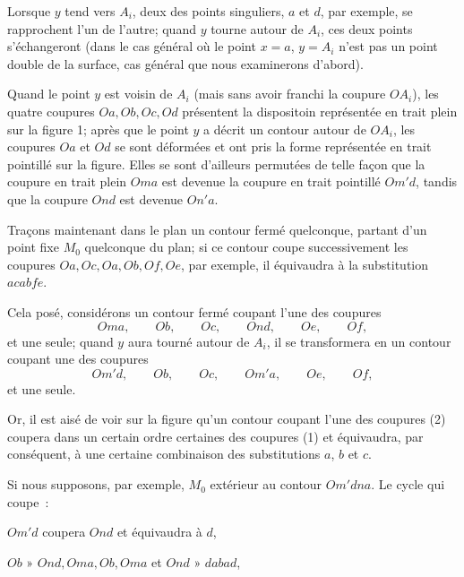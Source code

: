 \documentclass{article}
\begin{document}
Lorsque $y$ tend vers $A_{i}$, deux des points singuliers, $a$ et $d$, par exemple, se rapprochent l'un de l'autre; quand $y$ tourne autour de $A_{i}$, ces deux points s'échangeront (dans le cas général où le point $x = a$, $y = A_{i}$ n'est pas un point double de la surface, cas général que nous examinerons d'abord).

Quand le point $y$ est voisin de $A_{i}$ (mais sans avoir franchi la
coupure $OA_{i}$), les quatre coupures $Oa, Ob, Oc, Od$ présentent la dispositoin représentée en trait plein sur la figure 1; après que le point $y$ a décrit un contour autour de $OA_{i}$, les coupures $Oa$ et $Od$ se sont déformées et ont pris la forme représentée en trait
pointillé sur la figure. Elles se sont d'ailleurs permutées de telle façon que la coupure en trait plein $Oma$ est devenue la coupure en trait pointillé $Om'd$, tandis que la coupure $Ond$ est devenue $On'a$.

Traçons maintenant dans le plan un contour fermé quelconque, partant d'un point fixe $M_{0}$ quelconque du plan; si ce contour coupe successivement les coupures $Oa, Oc, Oa, Ob, Of, Oe$, par exemple, il équivaudra à la substitution $acabfe$.

Cela posé, considérons un contour fermé coupant l'une des coupures
\[ Oma, \qquad Ob, \qquad Oc, \qquad Ond, \qquad Oe, \qquad Of, \tag{1} \]
et une seule; quand $y$ aura tourné autour de $A_{i}$, il se transformera en un contour coupant une des coupures
\[ Om'd, \qquad Ob, \qquad Oc, \qquad Om'a, \qquad Oe, \qquad Of, \tag{2} \]
et une seule.

Or, il est aisé de voir sur la figure qu'un contour coupant l'une des coupures (2) coupera dans un certain ordre certaines des coupures (1) et équivaudra, par conséquent, à une certaine combinaison des substitutions $a$, $b$ et $c$.

Si nous supposons, par exemple, $M_{0}$ extérieur au contour $Om'dna$. Le cycle qui coupe~:

$Om'd$ coupera $Ond$ et équivaudra à $d$,

$Ob$ » $Ond, Oma, Ob, Oma$ et $Ond$ » $dabad$,
\end{document}
